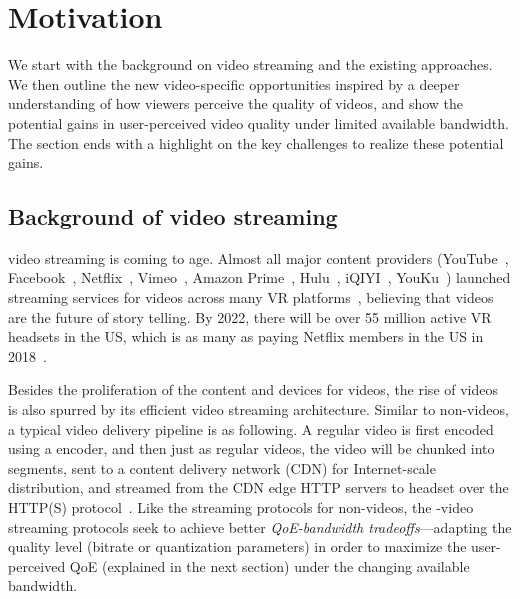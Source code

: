 
\section{Motivation}

We start with the background on \vr video streaming and the existing approaches.
We then outline the new \vr video-specific opportunities inspired by a deeper understanding of how viewers perceive the quality of \vr videos, and show the potential gains in user-perceived \vr video quality under limited available bandwidth. 
The section ends with a highlight on the key challenges to realize these potential gains.


\subsection{Background of \vr video streaming}

\vr video streaming is coming to age. 
Almost all major content providers (YouTube~\cite{??}, Facebook~\cite{??}, Netflix~\cite{??}, Vimeo~\cite{??}, Amazon Prime~\cite{??}, Hulu~\cite{??}, iQIYI~\cite{??}, YouKu~\cite{??}) launched streaming services for \vr videos across many VR platforms~\cite{oculus,samsung,daydreams,etc}, believing that \vr videos are the future of story telling. 
By 2022, there will be over 55 million active VR headsets in the US, which is as many as paying Netflix members in the US in 2018~\cite{https://qz.com/1298512/vr-could-be-as-big-in-the-us-as-netflix-in-five-years-study-shows/}.

Besides the proliferation of the content and devices for \vr videos, the rise of \vr videos is also spurred by its efficient video streaming architecture.
Similar to non-\vr videos, a typical \vr video delivery pipeline is as following. 
A regular video is first encoded using a \vr encoder, and then just as regular videos, the \vr video will be chunked into segments, sent to a content delivery network (CDN) for Internet-scale distribution, and streamed from the CDN edge HTTP servers to \vr headset over the HTTP(S) protocol~\cite{hls,https://www.wowza.com/solutions/streaming-types/virtual-reality-and-360-degree-streaming}.
Like the streaming protocols for non-\vr videos, the \vr-video streaming protocols seek to achieve better {\em QoE-bandwidth tradeoffs}---adapting the quality level (\eg bitrate or quantization parameters) in order to maximize the user-perceived QoE (explained in the next section) under the changing available bandwidth.



